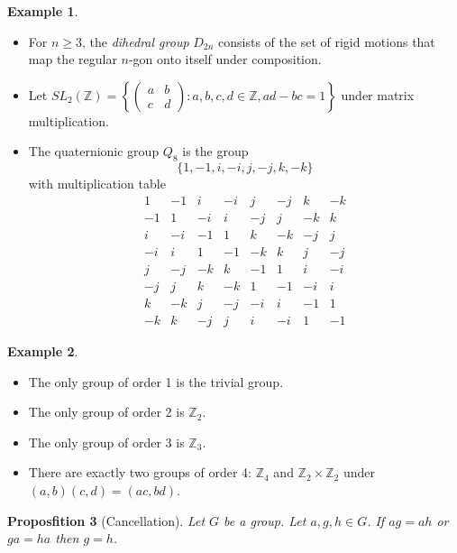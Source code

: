 \documentclass{book}
\newtheorem{prop}{Proposfition}[chapter]
\theoremstyle{definition}
\newtheorem{ex}[prop]{Example}
\begin{document}
\begin{ex}
\begin{itemize}
        \item For $n \geq 3$, the \emph{dihedral group} $D_{2n}$ consists of the set of rigid
              motions that map the regular $n$-gon onto itself under composition.
              \item Let $SL_2(\mathbb{Z}) = \left\{ \left( \begin{array}{cc}
              a & b \\
              c & d \end{array} \right)
              : a,b,c,d \in \mathbb{Z}, ad - bc = 1 \right\}$ under matrix multiplication.
\item The quaternionic group $Q_8$ is the group
\[ \{ 1, -1, i, -i, j, -j, k, -k \} \]
with multiplication table
\[ \begin{array}{cccccccc}
1 & -1 & i & -i & j & -j & k & -k \\
-1 & 1 & -i & i & -j & j & -k & k \\
i & -i & -1 & 1 & k & -k & -j & j \\
-i & i & 1 & -1 & -k & k & j & -j \\
j & -j & -k & k & -1 & 1 & i & -i \\
-j & j & k & -k & 1 & -1 & -i & i \\
k & -k & j & -j & -i & i & -1 & 1 \\
-k & k & -j & j & i & -i & 1 & -1
\end{array} \]
    \end{itemize}
\end{ex}

\begin{ex}
    \begin{itemize}
        \item The only group of order 1 is the trivial group.
        \item The only group of order 2 is $\mathbb{Z}_2$.
        \item The only group of order 3 is $\mathbb{Z}_3$.
        \item There are exactly two groups of order 4: $\mathbb{Z}_4$ and $\mathbb{Z}_2
                  \times \mathbb{Z}_2$ under $(a,b) (c,d) = (ac,bd)$.
    \end{itemize}
\end{ex}

\begin{prop}[Cancellation]
    Let $G$ be a group. Let $a,g,h \in G$. If $ag = ah$ or $ga = ha$ then $g = h$.
\end{prop}
\end{document}
